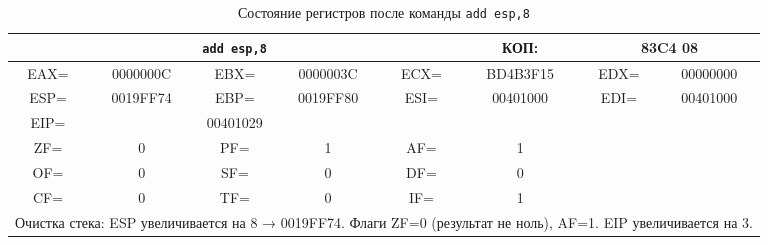 \begin{table}[H]
    \centering
    \caption{Состояние регистров после команды \texttt{add esp,8}}
    \label{tab:after_add_esp}
    \small
    \renewcommand{\arraystretch}{1.3}
    \begin{tabular}{|c|c|c|c|c|c|c|c|}
    \hline
    \multicolumn{5}{|c|}{\cellcolor{green!40}\textbf{\texttt{add esp,8}}} & \cellcolor{green!20} КОП: & \multicolumn{2}{c|}{\cellcolor{green!20} 83C4 08} \\
    \hline
    \cellcolor{blue!30} EAX= & 0000000C & \cellcolor{blue!30} EBX= & 0000003C & \cellcolor{blue!30} ECX= & BD4B3F15 & \cellcolor{blue!30} EDX= & 00000000 \\
    \hline
    \cellcolor{blue!30} ESP= & \cellcolor{red!70} 0019FF74 & \cellcolor{blue!30} EBP= & 0019FF80 & \cellcolor{blue!30} ESI= & 00401000 & \cellcolor{blue!30} EDI= & 00401000 \\
    \hline
    \cellcolor{blue!30} EIP= & \multicolumn{3}{c|}{\cellcolor{red!70} 00401029} & \multicolumn{4}{c|}{} \\
    \hline
    \cellcolor{pink} ZF= & \cellcolor{red!70} 0 & \cellcolor{pink} PF= & 1 & \cellcolor{pink} AF= & \cellcolor{red!70} 1 & \multicolumn{2}{c|}{\cellcolor{gray!50}} \\
    \cline{1-6}
    \cellcolor{pink} OF= & 0 & \cellcolor{pink} SF= & 0 & \cellcolor{pink} DF= & 0 & \multicolumn{2}{c|}{\cellcolor{gray!50}} \\
    \cline{1-6}
    \cellcolor{pink} CF= & 0 & \cellcolor{pink} TF= & 0 & \cellcolor{pink} IF= & 1 & \multicolumn{2}{c|}{\cellcolor{gray!50}} \\
    \hline
    \multicolumn{8}{|p{14cm}|}{Очистка стека: ESP увеличивается на 8 → 0019FF74. Флаги ZF=0 (результат не ноль), AF=1. EIP увеличивается на 3.} \\
    \hline
    \end{tabular}
\end{table}

